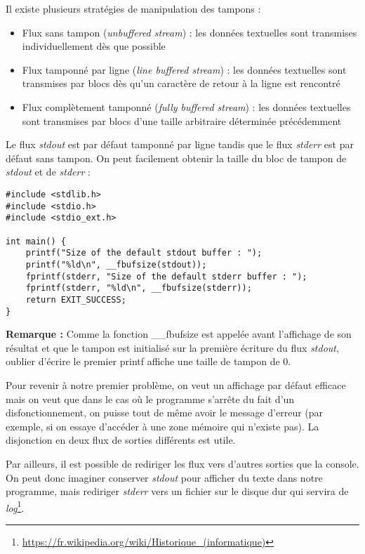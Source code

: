 \documentclass[../../../main.tex]{subfiles}
\begin{document}
Il existe plusieurs stratégies de manipulation des tampons :
\begin{itemize}
	\item Flux sans tampon (\textit{unbuffered stream}) : les données textuelles sont transmises individuellement dès que possible
	\item Flux tamponné par ligne (\textit{line buffered stream}) : les données textuelles sont transmises par blocs dès qu'un caractère de retour à la ligne est rencontré
	\item Flux complètement tamponné (\textit{fully buffered stream}) : les données textuelles sont transmises par blocs d'une taille arbitraire déterminée précédemment
\end{itemize}
Le flux \textit{stdout} est par défaut tamponné par ligne tandis que le flux \textit{stderr} est par défaut sans tampon. \newline
On peut facilement obtenir la taille du bloc de tampon de \textit{stdout} et de \textit{stderr} :
\begin{verbatim}
#include <stdlib.h>
#include <stdio.h>
#include <stdio_ext.h>

int main() {
	printf("Size of the default stdout buffer : ");
	printf("%ld\n", __fbufsize(stdout));
	fprintf(stderr, "Size of the default stderr buffer : ");
	fprintf(stderr, "%ld\n", __fbufsize(stderr));
	return EXIT_SUCCESS;
}
\end{verbatim}
\textbf{Remarque :} Comme la fonction \textsf{\_\_fbufsize} est appelée avant l'affichage de son résultat et que le tampon est initialisé sur la première écriture du flux \textit{stdout}, oublier d'écrire le premier \textsf{printf} affiche une taille de tampon de 0.
 
Pour revenir à notre premier problème, on veut un affichage par défaut efficace mais on veut que dans le cas où le programme s'arrête du fait d'un disfonctionnement, on puisse tout de même avoir le message d'erreur (par exemple, si on essaye d'accéder à une zone mémoire qui n'existe pas). La disjonction en deux flux de sorties différents est utile.
 
Par ailleurs, il est possible de rediriger les flux vers d'autres sorties que la console. On peut donc imaginer conserver \textit{stdout} pour afficher du texte dans notre programme, mais rediriger \textit{stderr} vers un fichier sur le disque dur qui servira de \textit{log}\footnote{\url{https://fr.wikipedia.org/wiki/Historique_(informatique)}}.
\end{document}
